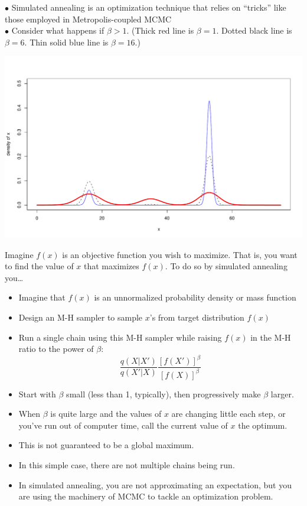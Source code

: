 \vspace*{-1.4em}
\enlargethispage*{100pt}
$\bullet$ Simulated annealing is an optimization technique that relies on ``tricks'' like those employed in Metropolis-coupled MCMC   \\
$\bullet$ Consider what happens if $\beta>1$. {\small (Thick red line is $\beta=1$.  Dotted black line is $\beta=6$. Thin solid blue line is
$\beta=16$.)}
\vspace*{-.19in}
\begin{center}
\includegraphics[width=.92\textwidth]{illus/3peaks_annealing.pdf}
\end{center}




 Imagine $f(x)$ is an objective function you wish to maximize.  That is, you want to find the value of $x$ that maximizes $f(x)$. To do so by simulated annealing you\ldots
\begin{itemize}
\item Imagine that $f(x)$ is an unnormalized probability density or mass function
\item Design an M-H sampler to sample $x$'s from target distribution $f(x)$
\item Run a single chain using this M-H sampler while raising $f(x)$ in the M-H ratio to the power of $\beta$:
\[
	\frac{q(X|X')}{q(X'|X)} \frac{[f(X')]^{\beta}}{[f(X)]^{\beta}}
\] 
\item Start with $\beta$ small (less than 1, typically), then progressively make $\beta$ larger.
\item When $\beta$ is quite large and the values of $x$ are changing little each step, or you've run out of computer time, call the current value of $x$ the optimum.
\item This is not guaranteed to be a global maximum. 
\item In this simple case, there are not multiple chains being run.
\item In simulated annealing, you are not approximating an expectation, but you are using the machinery of MCMC to tackle an optimization problem.
\end{itemize}






